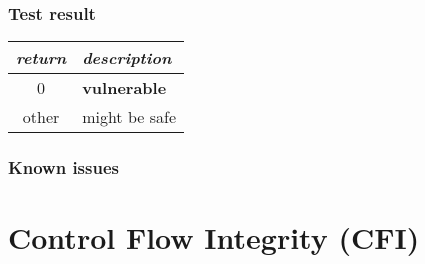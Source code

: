 \documentclass[a4paper]{book}
\begin{document}
\subsubsection{Test result}
\begin{tabular}{cl}
  \toprule
  \emph{return}  & \emph{description} \\
  \midrule
  0              & \textbf{vulnerable} \\
  other          & might be safe \\
  \bottomrule
\end{tabular}
\subsubsection{Known issues}
\newpage

\section{Control Flow Integrity (CFI)}
\end{document}
